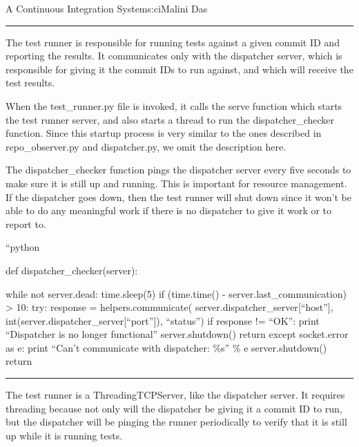 \begin{aosachapter}{A Continuous Integration System}{s:ci}{Malini Das}
\begin{center}\rule{3in}{0.4pt}\end{center}

\label{the-test-runner-testux5frunner.py}

The test runner is responsible for running tests against a given commit
ID and reporting the results. It communicates only with the dispatcher
server, which is responsible for giving it the commit IDs to run
against, and which will receive the test results.

When the test\_runner.py file is invoked, it calls the serve function
which starts the test runner server, and also starts a thread to run the
dispatcher\_checker function. Since this startup process is very similar
to the ones described in repo\_observer.py and dispatcher.py, we omit
the description here.

The dispatcher\_checker function pings the dispatcher server every five
seconds to make sure it is still up and running. This is important for
resource management. If the dispatcher goes down, then the test runner
will shut down since it won't be able to do any meaningful work if there
is no dispatcher to give it work or to report to.

\begin{aosadescription}
\item[``python]
\begin{aosadescription}
\item[def dispatcher\_checker(server):]
\begin{aosadescription}

\item[while not server.dead:]
time.sleep(5) if (time.time() - server.last\_communication)
\textgreater{} 10: try: response = helpers.communicate(
server.dispatcher\_server{[}``host''{]},
int(server.dispatcher\_server{[}``port''{]}), ``status'') if response !=
``OK'': print ``Dispatcher is no longer functional'' server.shutdown()
return except socket.error as e: print ``Can't communicate with
dispatcher: \%s'' \% e server.shutdown() return
\end{aosadescription}
\end{aosadescription}
\end{aosadescription}

\begin{center}\rule{3in}{0.4pt}\end{center}

The test runner is a ThreadingTCPServer, like the dispatcher server. It
requires threading because not only will the dispatcher be giving it a
commit ID to run, but the dispatcher will be pinging the runner
periodically to verify that it is still up while it is running tests.


\end{aosachapter}
